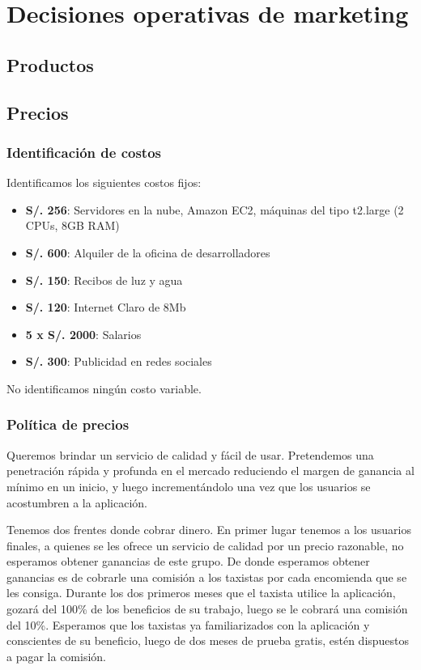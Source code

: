 \chapter{Decisiones operativas de marketing}

\section{Productos}

\section{Precios}

\subsection{Identificación de costos}
\label{sec:costos}
Identificamos los siguientes costos fijos:

\begin{itemize}
\item \textbf{S/. 256}: Servidores en la nube, Amazon EC2, máquinas del tipo t2.large (2 CPUs, 8GB RAM)
\item \textbf{S/. 600}: Alquiler de la oficina de desarrolladores
\item \textbf{S/. 150}: Recibos de luz y agua
\item \textbf{S/. 120}: Internet Claro de 8Mb
\item \textbf{5 x S/. 2000}: Salarios
\item \textbf{S/. 300}: Publicidad en redes sociales
\end{itemize}

No identificamos ningún costo variable.

\subsection{Política de precios}

Queremos brindar un servicio de calidad y fácil de usar. Pretendemos una penetración rápida y profunda en el mercado reduciendo el margen de ganancia al mínimo en un inicio, y luego incrementándolo una vez que los usuarios se acostumbren a la aplicación.

Tenemos dos frentes donde cobrar dinero. En primer lugar tenemos a los usuarios finales, a quienes se les ofrece un servicio de calidad por un precio razonable, no esperamos obtener ganancias de este grupo. De donde esperamos obtener ganancias es de cobrarle una comisión a los taxistas por cada encomienda que se les consiga. Durante los dos primeros meses que el taxista utilice la aplicación, gozará del 100\% de los beneficios de su trabajo, luego se le cobrará una comisión del 10\%. Esperamos que los taxistas ya familiarizados con la aplicación y conscientes de su beneficio, luego de dos meses de prueba gratis, estén dispuestos a pagar la comisión.


